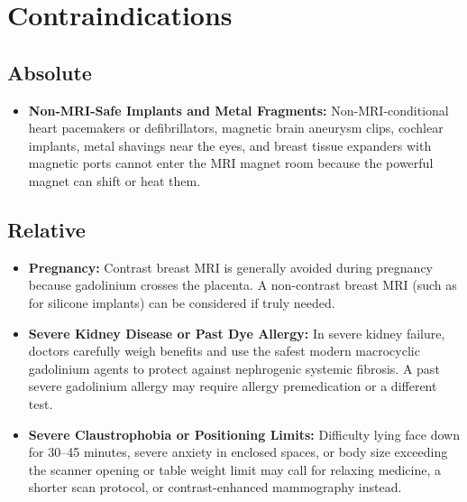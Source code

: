 \section{Contraindications}

\subsection{Absolute}
\begin{itemize}
\item \textbf{Non-MRI-Safe Implants and Metal Fragments:} Non-MRI-conditional heart pacemakers or defibrillators, magnetic brain aneurysm clips, cochlear implants, metal shavings near the eyes, and breast tissue expanders with magnetic ports cannot enter the MRI magnet room because the powerful magnet can shift or heat them.
\end{itemize}

\subsection{Relative}
\begin{itemize}
\item \textbf{Pregnancy:} Contrast breast MRI is generally avoided during pregnancy because gadolinium crosses the placenta. A non-contrast breast MRI (such as for silicone implants) can be considered if truly needed.
\item \textbf{Severe Kidney Disease or Past Dye Allergy:} In severe kidney failure, doctors carefully weigh benefits and use the safest modern macrocyclic gadolinium agents to protect against nephrogenic systemic fibrosis. A past severe gadolinium allergy may require allergy premedication or a different test.
\item \textbf{Severe Claustrophobia or Positioning Limits:} Difficulty lying face down for 30--45 minutes, severe anxiety in enclosed spaces, or body size exceeding the scanner opening or table weight limit may call for relaxing medicine, a shorter scan protocol, or contrast-enhanced mammography instead.
\end{itemize}

